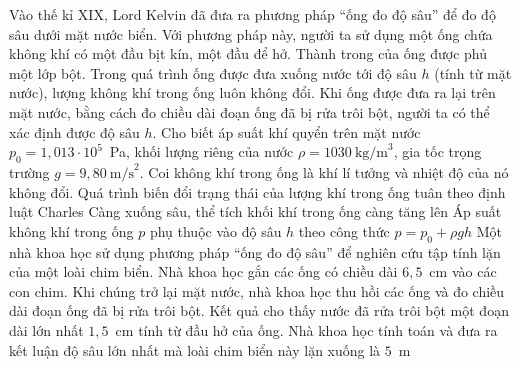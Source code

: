 	\begin{ex}%
		Vào thế kỉ XIX, Lord Kelvin đã đưa ra phương pháp ``ống đo độ sâu'' để đo độ sâu dưới mặt nước biển. Với phương pháp này, người ta sử dụng một ống chứa không khí có một đầu bịt kín, một đầu để hở. Thành trong của ống được phủ một lớp bột. Trong quá trình ống được đưa xuống nước tới độ sâu $h$ (tính từ mặt nước), lượng không khí trong ống luôn không đổi. Khi ống được đưa ra lại trên mặt nước, bằng cách đo chiều dài đoạn ống đã bị rửa trôi bột, người ta có thể xác định được độ sâu $h$. Cho biết áp suất khí quyển trên mặt nước $p_0=1{,}013\cdot 10^5$~Pa, khối lượng riêng của nước $\rho=1030~\text{kg/m}^3$, gia tốc trọng trường $g=9{,}80~\text{m/s}^2$. Coi không khí trong ống là khí lí tưởng và nhiệt độ của nó không đổi.
		\choiceTFt
		{Quá trình biến đổi trạng thái của lượng khí trong ống tuân theo định luật Charles}
		{Càng xuống sâu, thể tích khối khí trong ống càng tăng lên}
		{\True Áp suất không khí trong ống $p$ phụ thuộc vào độ sâu $h$ theo công thức $p=p_0+\rho gh$}
		{Một nhà khoa học sử dụng phương pháp ``ống đo độ sâu'' để nghiên cứu tập tính lặn của một loài chim biển. Nhà khoa học gắn các ống có chiều dài $6{,}5$~cm vào các con chim. Khi chúng trở lại mặt nước, nhà khoa học thu hồi các ống và đo chiều dài đoạn ống đã bị rửa trôi bột. Kết quả cho thấy nước đã rửa trôi bột một đoạn dài lớn nhất $1{,}5$~cm tính từ đầu hở của ống. Nhà khoa học tính toán và đưa ra kết luận độ sâu lớn nhất mà loài chim biển này lặn xuống là $5$~m}
	\end{ex}

